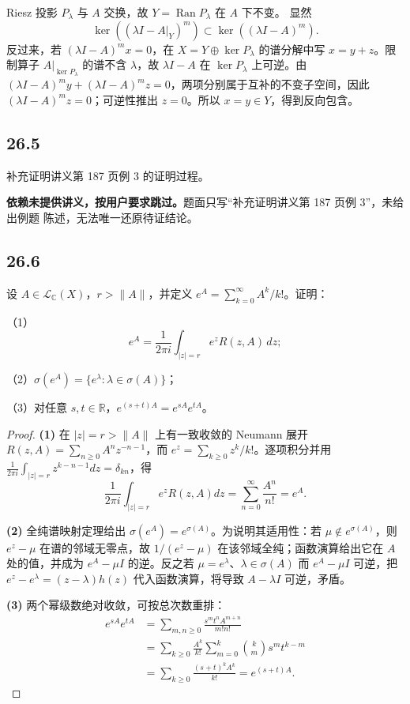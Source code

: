 Riesz 投影 $P_\lambda$ 与 $A$ 交换，故 $Y=\operatorname{Ran}P_\lambda$ 在 $A$ 下不变。
显然
\[
 \ker((\lambda I-A|_Y)^m)\subset\ker((\lambda I-A)^m).
\]
反过来，若 $(\lambda I-A)^mx=0$，在 $X=Y\oplus\ker P_\lambda$ 的谱分解中写
$x=y+z$。限制算子 $A|_{\ker P_\lambda}$ 的谱不含 $\lambda$，故
$\lambda I-A$ 在 $\ker P_\lambda$ 上可逆。由
$(\lambda I-A)^my+(\lambda I-A)^mz=0$，两项分别属于互补的不变子空间，因此
$(\lambda I-A)^mz=0$；可逆性推出 $z=0$。所以 $x=y\in Y$，得到反向包含。

\subsection*{26.5}
\begin{problem}
补充证明讲义第 187 页例 3 的证明过程。
\end{problem}

\textbf{依赖未提供讲义，按用户要求跳过。}题面只写“补充证明讲义第 187 页例 3”，未给出例题
陈述，无法唯一还原待证结论。

\subsection*{26.6}
\begin{problem}
设 $A\in\mathcal L_{\mathbb C}(X)$，$r>\|A\|$，并定义
$e^A=\sum_{k=0}^{\infty}A^k/k!$。证明：

（1）
\[
 e^A=\frac1{2\pi i}\int_{|z|=r}e^zR(z,A)\,dz;
\]

（2）$\sigma(e^A)=\{e^\lambda:\lambda\in\sigma(A)\}$；

（3）对任意 $s,t\in\mathbb R$，$e^{(s+t)A}=e^{sA}e^{tA}$。
\end{problem}

\begin{proof}
\textbf{(1)} 在 $|z|=r>\|A\|$ 上有一致收敛的 Neumann 展开
$R(z,A)=\sum_{n\geq0}A^nz^{-n-1}$，而
$e^z=\sum_{k\geq0}z^k/k!$。逐项积分并用
$\frac1{2\pi i}\int_{|z|=r}z^{k-n-1}dz=\delta_{kn}$，得
\[
 \frac1{2\pi i}\int_{|z|=r}e^zR(z,A)dz
 =\sum_{n=0}^\infty\frac{A^n}{n!}=e^A.
\]

\textbf{(2)} 全纯谱映射定理给出
$\sigma(e^A)=e^{\sigma(A)}$。为说明其适用性：若
$\mu\notin e^{\sigma(A)}$，则 $e^z-\mu$ 在谱的邻域无零点，故
$1/(e^z-\mu)$ 在该邻域全纯；函数演算给出它在 $A$ 处的值，并成为
$e^A-\mu I$ 的逆。反之若 $\mu=e^\lambda$、$\lambda\in\sigma(A)$ 而
$e^A-\mu I$ 可逆，把 $e^z-e^\lambda=(z-\lambda)h(z)$ 代入函数演算，将导致
$A-\lambda I$ 可逆，矛盾。

\textbf{(3)} 两个幂级数绝对收敛，可按总次数重排：
\begin{align*}
 e^{sA}e^{tA}
 &=\sum_{m,n\geq0}\frac{s^mt^nA^{m+n}}{m!n!}\\
 &=\sum_{k\geq0}\frac{A^k}{k!}\sum_{m=0}^k\binom{k}{m}s^mt^{k-m}\\
 &=\sum_{k\geq0}\frac{(s+t)^kA^k}{k!}=e^{(s+t)A}.
\end{align*}
\end{proof}

